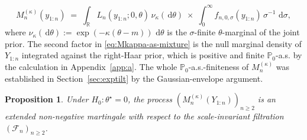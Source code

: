 \documentclass[12pt, a4paper]{report}
\newcommand{\dd}{\,\mathrm{d}}
\newtheorem{proposition}[theorem]{Proposition}
\newcommand{\1}{\mathbf{1}}
\begin{document}
\begin{equation}\label{eq:Mkappa-as-mixture}
M_n^{(\kappa)}(y_{1:n})
\;=\;\int_\mathbb{R} L_n(y_{1:n};0,\theta)\,\nu_\kappa(\dd\theta)
\;\times\; \int_0^\infty f_{n,0,\sigma}(y_{1:n})\,\sigma^{-1}\,\dd\sigma,
\end{equation}
where \(\nu_\kappa(\dd\theta) := \exp(-\kappa(\theta-m))\,\dd\theta\) is
the \(\sigma\)-finite \(\theta\)-marginal of the joint prior. The
second factor in \eqref{eq:Mkappa-as-mixture} is the null marginal
density of \(Y_{1:n}\) integrated against the right-Haar prior, which is
positive and finite \(\mathbb{P}_0\)-a.s. by the calculation in Appendix~\ref{app:a}. The whole \(\mathbb{P}_0\)-a.s.-finiteness of \(M_n^{(\kappa)}\) was established in Section~\ref{sec:exptilt} by the Gaussian-envelope argument.

\begin{proposition}\label{prop:extended-mg}
Under \(H_0:\theta^\star=0\), the process
\((M_n^{(\kappa)}(Y_{1:n}))_{n\geq 2}\) is an extended non-negative
martingale with respect to the scale-invariant filtration
\((\mathcal{F}_n)_{n\geq 2}\).
\end{proposition}
\end{document}
